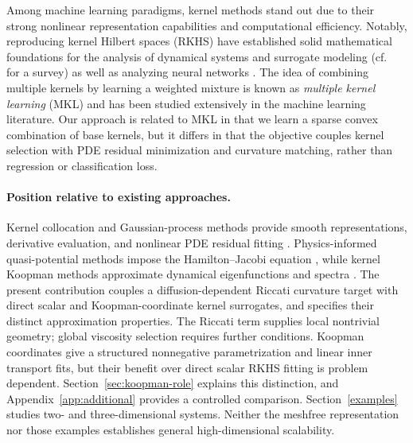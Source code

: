 \documentclass[11pt]{article}
\theoremstyle{plain}      %
\theoremstyle{definition} %
\begin{document}
Among machine learning paradigms, kernel methods stand out due to their strong nonlinear representation capabilities and computational efficiency. Notably, reproducing kernel Hilbert spaces (RKHS) \cite{CuckerandSmale} have established solid mathematical foundations for the analysis of  dynamical systems \cite{BH4, yk1, bhcm11,bhcm1, lyap_bh, bh_sparse_kfs, BHPhysicaD, hamzi2019kernel, bh2020b,SKO3,ALEXANDER2020132520,bh12,bh17,hb17,mmd_kernels_bh, hamzipaillet,jalalian_deds_2023,lee2024note, hamzi2025kernel_lions, bittracher2021dimensionality} and surrogate modeling (cf.\ \cite{santinhaasdonk19} for a survey) as well as analyzing neural networks \cite{smirnov2022mean}. The idea of combining multiple kernels by learning a weighted mixture is known as \emph{multiple kernel learning} (MKL) \cite{lanckriet2004learning, bach2004multiple} and has been studied extensively in the machine learning literature. Our approach is related to MKL in that we learn a sparse convex combination of base kernels, but it differs in that the objective couples kernel selection with PDE residual minimization and curvature matching, rather than regression or classification loss.

\paragraph{Position relative to existing approaches.}\label{sec:positioning}
Kernel collocation and Gaussian-process methods provide smooth representations, derivative evaluation, and nonlinear PDE residual fitting \cite{Chen2021}. Physics-informed quasi-potential methods impose the Hamilton--Jacobi equation \cite{li2022machine,lin2022data}, while kernel Koopman methods approximate dynamical eigenfunctions and spectra \cite{Williams2015}. The present contribution couples a diffusion-dependent Riccati curvature target with direct scalar and Koopman-coordinate kernel surrogates, and specifies their distinct approximation properties. The Riccati term supplies local nontrivial geometry; global viscosity selection requires further conditions. Koopman coordinates give a structured nonnegative parametrization and linear inner transport fits, but their benefit over direct scalar RKHS fitting is problem dependent. Section~\ref{sec:koopman-role} explains this distinction, and Appendix~\ref{app:additional} provides a controlled comparison. Section~\ref{examples} studies two- and three-dimensional systems. Neither the meshfree representation nor those examples establishes general high-dimensional scalability.
\end{document}
